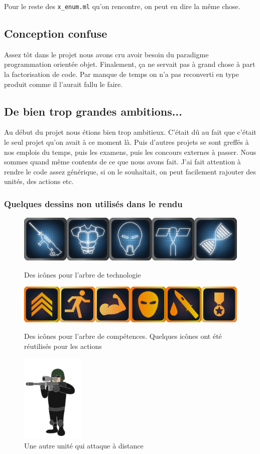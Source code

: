 \documentclass{article}
\begin{document}
Pour le reste des \texttt{x\_enum.ml} qu'on rencontre, on peut en dire la même chose.

\subsection{Conception confuse}
Assez tôt dans le projet nous avons cru avoir besoin du paradigme programmation orientée objet. Finalement,
ça ne servait pas à grand chose à part la factorisation de code. Par manque de temps on n'a pas
reconverti en type produit comme il l'aurait fallu le faire.

\subsection{De bien trop grandes ambitions...}
Au début du projet nous étions bien trop ambitieux. C'était dû au fait que c'était le seul projet qu'on avait à ce moment là. Puis
d'autres projets se sont greffés à nos emplois du temps, puis les examens, puis les concours externes à passer. Nous sommes quand même
contents de ce que nous avons fait. J'ai fait attention à rendre le code assez générique, si on le souhaitait, on peut facilement rajouter des unités,
des actions etc.

\subsubsection{Quelques dessins non utilisés dans le rendu}
    \begin{figure}[H]
        \centering
     \includegraphics[scale=0.5]{asset/image/tech.png}
    \caption{Des icônes pour l'arbre de technologie}
    \vspace{1cm}

     \includegraphics[scale=0.5]{asset/image/skill.png}
    \caption{Des icônes pour l'arbre de compétences. Quelques icônes ont été réutilisés pour les actions}
    \vspace{1cm}

     \includegraphics[scale=0.5]{asset/image/sniper_eu.png}
    \caption{Une autre unité qui attaque à distance}
    \end{figure}
\end{document}
